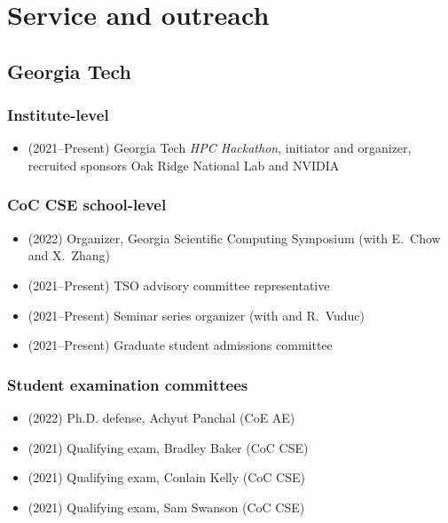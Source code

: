 \section{Service and outreach}

\subsection{Georgia Tech}

\subsubsection{Institute-level}
\begin{itemize}
    \item (2021--Present) Georgia Tech \textit{HPC Hackathon}, initiator and organizer, recruited sponsors Oak Ridge National Lab and NVIDIA 
\end{itemize}

\subsubsection{CoC CSE school-level}
\begin{itemize}
    \item (2022) Organizer, Georgia Scientific Computing Symposium (with E.\ Chow and X.\ Zhang)
    \item (2021--Present) TSO advisory committee representative
    \item (2021--Present) Seminar series organizer (with \Florian and R.\ Vuduc)
    \item (2021--Present) Graduate student admissions committee
\end{itemize}

\subsubsection{Student examination committees}
\begin{itemize}
    \item (2022) Ph.D. defense, Achyut Panchal (CoE AE)
    \item (2021) Qualifying exam, Bradley Baker (CoC CSE)
    \item (2021) Qualifying exam, Conlain Kelly (CoC CSE)
    \item (2021) Qualifying exam, Sam Swanson (CoC CSE)
\end{itemize}

